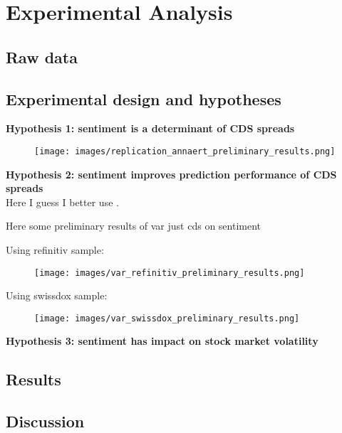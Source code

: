 \chapter{Experimental Analysis}\label{sec5}
\thispagestyle{empty}

\section{Raw data}

\section{Experimental design and hypotheses}

\textbf{Hypothesis 1: sentiment is a determinant of CDS spreads}
\cite{annaert2013} \\

\begin{figure}[h]
\texttt{[image: images/replication\_annaert\_preliminary\_results.png]}
\end{figure}

\newpage

\noindent
\textbf{Hypothesis 2: sentiment improves prediction performance of CDS spreads}
\cite{gunduz2011} \\
Here I guess I better use \cite{cathcart2020}.

Here some preliminary results of var just cds on sentiment

Using refinitiv sample:

\begin{figure}[h]
\texttt{[image: images/var\_refinitiv\_preliminary\_results.png]}
\end{figure}

\newpage

Using swissdox sample:

\begin{figure}[h]
\texttt{[image: images/var\_swissdox\_preliminary\_results.png]}
\end{figure}

\noindent
\textbf{Hypothesis 3: sentiment has impact on stock market volatility}
\cite{audrino2020}


\section{Results}

\section{Discussion}





\cleardoublepage
